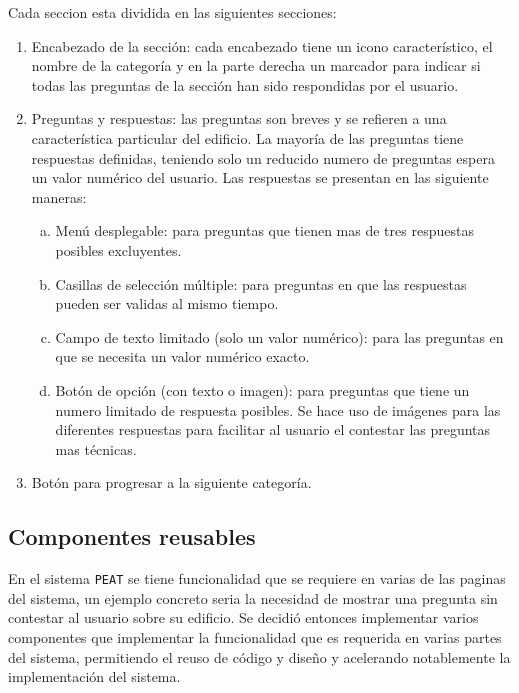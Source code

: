 Cada seccion esta dividida en las siguientes secciones:
\begin{enumerate}
\item Encabezado de la sección: cada encabezado tiene un icono característico,
  el nombre de la categoría y en la parte derecha un marcador para indicar
  si todas las preguntas de la sección han sido respondidas por el usuario.
\item Preguntas y respuestas: las preguntas son breves y se refieren a una
  característica particular del edificio. La mayoría de las preguntas
  tiene respuestas definidas, teniendo solo un reducido numero de preguntas
  espera un valor numérico del usuario. Las respuestas se
  presentan en las siguiente maneras:
  \begin{enumerate}[a)]
  \item Menú desplegable: para preguntas que tienen mas de tres respuestas
    posibles excluyentes.
  \item Casillas de selección múltiple: para preguntas en que las respuestas
    pueden ser validas al mismo tiempo.
  \item Campo de texto limitado (solo un valor numérico): para las preguntas
    en que se necesita un valor numérico exacto.
  \item Botón de opción (con texto o imagen): para preguntas que tiene un
    numero limitado de respuesta posibles. Se hace uso de imágenes para las
    diferentes respuestas para facilitar al usuario el contestar las preguntas
    mas técnicas.
  \end{enumerate}
\item Botón para progresar a la siguiente categoría.
\end{enumerate}


\subsection{Componentes reusables}
\label{subsec:componentes}

En el sistema \texttt{PEAT} se tiene funcionalidad que se requiere en
varias de las paginas del sistema, un ejemplo concreto seria la necesidad
de mostrar una pregunta sin contestar al usuario sobre su edificio.
Se decidió entonces implementar varios componentes que implementar la
funcionalidad que es requerida en varias partes del sistema, permitiendo
el reuso de código y diseño y acelerando notablemente la implementación
del sistema.


